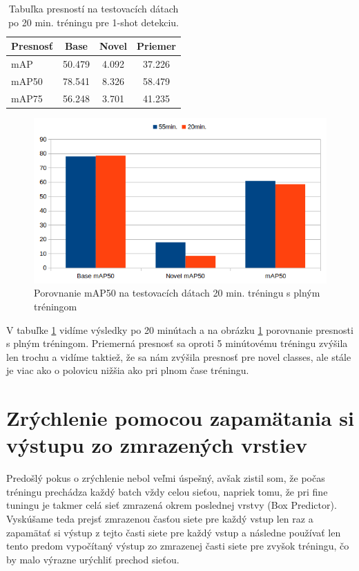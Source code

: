 \begin{table}[H]
\begin{tabular}{|l|c|c|c|}
\hline
\textbf{Presnosť} & \textbf{Base} & \textbf{Novel} & \textbf{Priemer} \\
\hline
mAP & 50.479 & 4.092 & 37.226 \\
mAP50 & 78.541 & 8.326 & 58.479 \\
mAP75 & 56.248 & 3.701 & 41.235 \\
\hline
\end{tabular}
\centering
\caption{Tabuľka presností na testovacích dátach po 20 min. tréningu pre 1-shot detekciu.}
\label{tab:table51}
\end{table}

\begin{figure}[H]
\centering
\includegraphics[width=\textwidth]{images/chart_compare_20min.png}
\caption{Porovnanie mAP50 na testovacích dátach 20 min. tréningu s plným tréningom}
\label{fig:image4}
\end{figure}

V tabuľke \ref{tab:table51} vidíme výsledky po 20 minútach a na obrázku \ref{fig:image4} porovnanie presnosti s plným tréningom. Priemerná presnosť sa oproti 5 minútovému tréningu zvýšila len trochu a vidíme taktiež, že sa nám zvýšila presnosť pre novel classes, ale stále je viac ako o polovicu nižšia ako pri plnom čase tréningu.


\section{Zrýchlenie pomocou zapamätania si výstupu zo zmrazených vrstiev}

Predošlý pokus o zrýchlenie nebol veľmi úspešný, avšak zistil som, že počas tréningu prechádza každý batch vždy celou sieťou, napriek tomu, že pri fine tuningu je takmer celá sieť zmrazená okrem poslednej vrstvy (Box Predictor). Vyskúšame teda prejsť zmrazenou časťou siete pre každý vstup len raz a zapamätať si výstup z tejto časti siete pre každý vstup a následne používať len tento predom vypočítaný výstup zo zmrazenej časti siete pre zvyšok tréningu, čo by malo výrazne urýchliť prechod sieťou.

